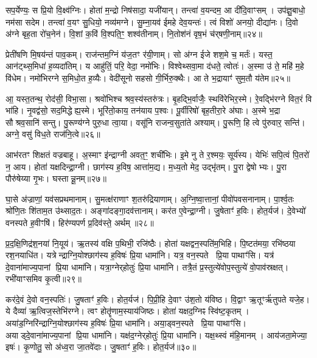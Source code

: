 सप॒र्येण्यः॒ स प्रि॒यो वि॒क्ष्व॑ग्निः।
होता॑ म॒न्द्रो निष॑सादा॒ यजी॑यान्।
तन्त्वा॑ व॒यन्दम॒ आ दी॑दि॒वाꣳसम्।
उप॑ज्ञु॒बाधो॒ नम॑सा सदेम।
तन्त्वा॑ व॒यꣳ सु॒धियो॒ नव्य॑मग्ने।
सु॒म्ना॒यव॑ ईमहे देव॒यन्तः॑।
त्वं विशो॑ अनयो॒ दीद्या॑नः।
दि॒वो अ॑ग्ने बृह॒ता रो॑च॒नेन॑।
वि॒शां क॒विं वि॒श्पति॒ꣳ॒ शश्व॑तीनाम्।
नि॒तोश॑नं वृष॒भं च॑र्‌\mbox{}षणी॒नाम्॥२४॥

प्रेती॑षणि मि॒षय॑न्तं पाव॒कम्।
राज॑न्तम॒ग्निं य॑ज॒तꣳ र॑यी॒णाम्।
सो अ॑ग्न ईजे शश॒मे च॒ मर्तः॑।
यस्त॒ आन॑ट्थ्स॒मिधा॑ ह॒व्यदा॑तिम्।
य आहु॑तिं॒ परि॒ वेदा॒ नमो॑भिः।
विश्वेथ्सवा॒मा द॑धते॒ त्वोतः॑।
अ॒स्मा उ॑ ते॒ महि॑ म॒हे वि॑धेम।
नमो॑भिरग्ने स॒मिधो॒त ह॒व्यैः।
वेदी॑सूनो सहसो गी॒र्भिरु॒क्थैः।
आ ते भ॒द्रायाꣳ॑ सुम॒तौ य॑तेम॥२५॥

आ॒ यस्त॒तन्थ॒ रोद॑सी॒ विभा॒सा।
श्रवो॑भिश्च श्रव॒स्य॑स्तरु॑त्रः।
बृ॒हद्भि॒र्वाजैः॒ स्थवि॑रेभिर॒स्मे।
रे॒वद्भि॑रग्ने वित॒रं वि भा॑हि।
नृ॒वद्व॑सो॒ सद॒मिद्धेह्य॒स्मे।
भूरि॑तो॒काय॒ तन॑याय प॒श्वः।
पू॒र्वीरिषो॑ बृह॒तीरा॒रे अ॑घाः।
अ॒स्मे भ॒द्रा सौश्रव॒सानि॑ सन्तु।
पु॒रूण्य॑ग्ने पुरु॒धा त्वा॒या।
वसू॑नि राजन्व॒सुता॑ते अश्याम्।
पु॒रूणि॒ हि त्वे पु॑रुवार॒ सन्ति॑।
अग्ने॒ वसु॑ विध॒ते राज॑नि॒त्वे॥२६॥\anuvakamend[जा॒गृ॒वाꣳसो॒ अनु॑ग्म॒न्मानु॑षाणाञ्चर्‌\mbox{}षणी॒नां य॑तेमाश्या॒न्द्वे च॑]

आभ॑रतꣳ शिक्षतं वज्रबाहू।
अ॒स्माꣳ इ॑न्द्राग्नी अवत॒ꣳ॒ शची॑भिः।
इ॒मे नु ते र॒श्मयः॒ सूर्य॑स्य।
येभिः॑ सपि॒त्वं पि॒तरो॑ न॒ आय\sn{}।
होता॑ यक्षदिन्द्रा॒ग्नी।
छाग॑स्य ह॒विष॒ आत्ता॑म॒द्य।
म॒ध्य॒तो मेद॒ उद्भृ॑तम्।
पु॒रा द्वेषोभ्यः।
पु॒रा पौरु॑षेय्या गृ॒भः।
घस्तान्नू॒नम्॥२७॥

घा॒से अ॑ज्राणां॒ यव॑सप्रथमानाम्।
सु॒मत्क्ष॑राणाꣳ श॒तरु॑द्रियाणाम्।
अ॒ग्नि॒ष्वा॒त्तानां॒ पीवो॑पवसनानाम्।
पा॒र्श्व॒तः श्रो॑णि॒तः शि॑ताम॒त उ॑थ्साद॒तः।
अङ्गा॑दङ्गा॒दव॑त्तानाम्।
कर॑त ए॒वेन्द्रा॒ग्नी।
जु॒षेताꣳ॑ ह॒विः।
होत॒र्यज॑।
दे॒वेभ्यो॑ वनस्पते ह॒वीꣳषि॑।
हिर॑ण्यपर्ण प्र॒दिव॑स्ते॒ अर्थम्॥२८॥

प्र॒द॒क्षि॒णिद्र॑श॒नया॑ नि॒यूय॑।
ऋ॒तस्य॑ वक्षि प॒थिभी॒ रजि॑ष्ठैः।
होता॑ यक्षद्वन॒स्पति॑म॒भिहि।
पि॒ष्टत॑मया॒ रभि॑ष्ठया रश॒नयाधि॑त।
यत्रेन्द्राग्नि॒योश्छाग॑स्य ह॒विषः॑ प्रि॒या धामा॑नि।
यत्र॒ वन॒स्पते प्रि॒या पाथाꣳ॑सि।
यत्र॑ दे॒वाना॑माज्य॒पानां प्रि॒या धामा॑नि।
यत्रा॒ग्नेर्‌\mbox{}होतुः॑ प्रि॒या धामा॑नि।
तत्रै॒तं प्र॒स्तुत्ये॑वोप॒स्तुत्ये॑ वो॒पाव॑स्रक्षत्।
रभी॑याꣳसमिव कृ॒त्वी॥२९॥

कर॑दे॒वं दे॒वो वन॒स्पतिः॑।
जु॒षताꣳ॑ ह॒विः।
होत॒र्यज॑।
पि॒प्री॒हि दे॒वाꣳ उ॑श॒तो य॑विष्ठ।
वि॒द्वाꣳ ऋ॒तूꣳर्\mbox{}ऋ॑तुपते यजे॒ह।
ये दैव्या॑ ऋ॒त्विज॒स्तेभि॑रग्ने।
त्वꣳ होतॄ॑णाम॒स्याय॑जिष्ठः।
होता॑ यक्षद॒ग्निꣴ स्वि॑ष्ट॒कृतम्।
अया॑ड॒ग्निरि॑न्द्राग्नि॒योश्छाग॑स्य ह॒विषः॑ प्रि॒या धामा॑नि।
अया॒ड्वन॒स्पते प्रि॒या पाथाꣳ॑सि।
अयाड्दे॒वाना॑माज्य॒पानां प्रि॒या धामा॑नि।
यक्ष॑द॒ग्नेर्‌\mbox{}होतुः॑ प्रि॒या धामा॑नि।
यक्ष॒थ्स्वं म॑हि॒मानम्।
आय॑जता॒मेज्या॒ इषः॑।
कृ॒णोतु॒ सो अ॑ध्व॒रा जा॒तवे॑दाः।
जु॒षताꣳ॑ ह॒विः।
होत॒र्यज॑॥३०॥\anuvakamend[नू॒नमर्थं॑ कृ॒त्वी पाथाꣳ॑सि स॒प्त च॑]

